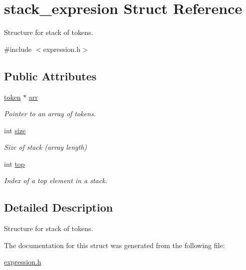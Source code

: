 \hypertarget{structstack__expresion}{}\section{stack\+\_\+expresion Struct Reference}
\label{structstack__expresion}


Structure for stack of tokens.  




{\ttfamily \#include $<$expression.\+h$>$}

\subsection*{Public Attributes}
\begin{DoxyCompactItemize}
\item 
\hypertarget{structstack__expresion_a975af406eb276e2cf4d58928f3aa6cb9}{}\hyperlink{structtoken}{token} $\ast$ \hyperlink{structstack__expresion_a975af406eb276e2cf4d58928f3aa6cb9}{arr}\label{structstack__expresion_a975af406eb276e2cf4d58928f3aa6cb9}

\begin{DoxyCompactList}\small\item\em Pointer to an array of tokens. \end{DoxyCompactList}\item 
\hypertarget{structstack__expresion_aebb43764c9357a3692570f8ae3de602e}{}int \hyperlink{structstack__expresion_aebb43764c9357a3692570f8ae3de602e}{size}\label{structstack__expresion_aebb43764c9357a3692570f8ae3de602e}

\begin{DoxyCompactList}\small\item\em Size of stack (array length) \end{DoxyCompactList}\item 
\hypertarget{structstack__expresion_afb0f068668196c0ed32494f1307317fb}{}int \hyperlink{structstack__expresion_afb0f068668196c0ed32494f1307317fb}{top}\label{structstack__expresion_afb0f068668196c0ed32494f1307317fb}

\begin{DoxyCompactList}\small\item\em Index of a top element in a stack. \end{DoxyCompactList}\end{DoxyCompactItemize}


\subsection{Detailed Description}
Structure for stack of tokens. 

The documentation for this struct was generated from the following file\+:\begin{DoxyCompactItemize}
\item 
\hyperlink{expression_8h}{expression.\+h}\end{DoxyCompactItemize}
